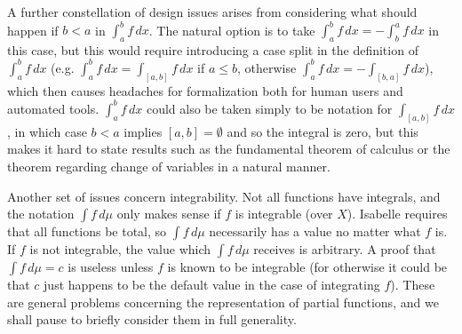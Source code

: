 \documentclass{amsart}
\theoremstyle{definition}
\theoremstyle{remark}
\begin{document}
A further constellation of design issues arises from considering what should happen if $b < a$ in $\int_a^b f \, dx$. The natural option is to take $\int_a^b f \, dx = -\int_b^a f \, dx$ in this case, but this would require introducing a case split in the definition of $\int_a^b f \, dx$ (e.g. $\int_a^b f \, dx = \int_{[a,b]} f \, dx$ if $a \le b$, otherwise $\int_a^b f \, dx = -\int_{[b,a]} f \, dx$), which then causes headaches for formalization both for human users and automated tools. $\int_a^b f \, dx$ could also be taken simply to be notation for $\int_{[a,b]} f \, dx$, in which case $b < a$ implies $[a,b] = \emptyset$ and so the integral is zero, but this makes it hard to state results such as the fundamental theorem of calculus or the theorem regarding change of variables in a natural manner.

Another set of issues concern integrability. Not all functions have integrals, and the notation $\int f \, d\mu$ only makes sense if $f$ is integrable (over $X$). Isabelle requires that all functions be total, so $\int f \, d\mu$ necessarily has a value no matter what $f$ is. If $f$ is not integrable, the value which $\int f \, d\mu$ receives is arbitrary. A proof that $\int f \, d\mu = c$ is useless unless $f$ is known to be integrable (for otherwise it could be that $c$ just happens to be the default value in the case of integrating $f$). These are general problems concerning the representation of partial functions, and we shall pause to briefly consider them in full generality.
\end{document}
